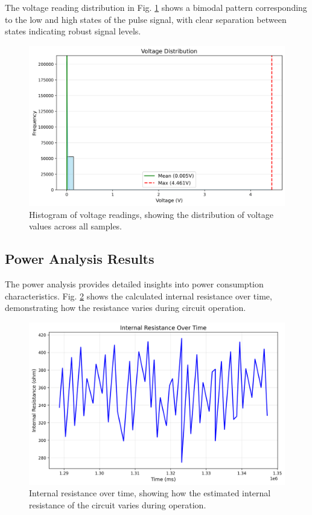 \documentclass[conference]{IEEEtran}
\begin{document}
The voltage reading distribution in Fig. \ref{fig:pulse_voltage_hist} shows a bimodal pattern corresponding to the low and high states of the pulse signal, with clear separation between states indicating robust signal levels.

\begin{figure}[htbp]
    \centering
    \includegraphics[width=\linewidth]{data/pulse_session_2025-05-09_1442/plots/pulse_voltage_hist.png}
    \caption{Histogram of voltage readings, showing the distribution of voltage values across all samples.}
    \label{fig:pulse_voltage_hist}
\end{figure}

\subsection{Power Analysis Results}
The power analysis provides detailed insights into power consumption characteristics. Fig. \ref{fig:power_resistance} shows the calculated internal resistance over time, demonstrating how the resistance varies during circuit operation.

\begin{figure}[htbp]
    \centering
    \includegraphics[width=\linewidth]{data/power_session_2025-05-09_1440/plots/power_resistance.png}
    \caption{Internal resistance over time, showing how the estimated internal resistance of the circuit varies during operation.}
    \label{fig:power_resistance}
\end{figure}
\end{document}
